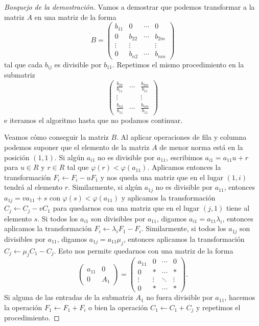 \begin{proof}[Bosquejo de la demostración]
Vamos a demostrar que podemos transformar a la matriz $A$ en una matriz de la forma
\begin{equation*}
B=\begin{pmatrix}
	b_{11} & 0 & \cdots & 0\\
	0 & b_{22} & \cdots & b_{2m}\\
	\vdots & \vdots &&  \vdots\\
	0 & b_{n2} & \cdots & b_{nm}
\end{pmatrix}
\end{equation*}
tal que cada $b_{ij}$ es divisible por $b_{11}$. Repetimos el mismo procedimiento en la submatriz 
\[
\begin{pmatrix}
	\frac{b_{22}}{b_{11}} & \cdots & \frac{b_{2m}}{b_{11}}\\
	\vdots & &\vdots \\
	\frac{b_{n2}}{b_{11}} & \cdots & \frac{b_{nm}}{b_{11}}
\end{pmatrix}
\]
e iteramos el algoritmo hasta que no podamos continuar. 

Veamos cómo conseguir la matriz $B$. 
Al aplicar operaciones de fila y columna podemos suponer que el elemento de la matriz $A$ 
de menor norma está en la posición
$(1,1)$.  
Si algún $a_{i1}$ no es divisible por $a_{11}$, escribimos  
$a_{i1}=a_{11}u+r$ para $u\in R$ y $r\in R$ tal que $\varphi(r)<\varphi(a_{11})$. Aplicamos entonces la transformación
$F_i\leftarrow F_i-uF_1$ y nos queda una matriz
que en el lugar $(1,i)$ tendrá al elemento $r$. Similarmente, si algún $a_{1j}$
no es divisible por $a_{11}$, entonces $a_{1j}=va_{11}+s$ con $\varphi(s)<\varphi(a_{11})$ y 
aplicamos la transformación $C_j\leftarrow C_j-vC_1$ para quedarnos con una matriz que en el lugar 
$(j,1)$ tiene al elemento $s$.  
Si todos los $a_{i1}$ son divisibles por $a_{11}$, digamos $a_{i1}=a_{11}\lambda_i$, entonces
aplicamos la transformación $F_i\leftarrow \lambda_i F_1-F_i$. Similarmente, si todos los
$a_{1j}$ son divisibles por $a_{11}$, digamos $a_{1j}=a_{11}\mu_j$, entonces aplicamos
la transformación $C_j\leftarrow \mu_j C_1-C_j$. Esto nos permite quedarnos con una matriz
de la forma
\[
\begin{pmatrix}
	a_{11} & 0\\
	0 & A_1
\end{pmatrix}
=\begin{pmatrix}
	a_{11} & 0 & \cdots & 0\\
	0 & * & \cdots & *\\
	\vdots & \vdots & \ddots & \vdots \\
	0 & * & \cdots & *
\end{pmatrix}.
\]
Si alguna de las entradas de la submatriz $A_1$ no fuera divisible por $a_{11}$, hacemos la operación
$F_1\leftarrow F_1+F_i$ o bien la operación $C_1\leftarrow C_1+C_j$ y repetimos
el procedimiento.
\end{proof}


